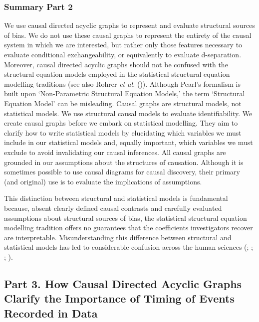 \documentclass[
  single column]{article}
\begin{document}
\newpage{}

\subsubsection{Summary Part 2}\label{summary-part-2}

We use causal directed acyclic graphs to represent and evaluate
structural sources of bias. We do not use these causal graphs to
represent the entirety of the causal system in which we are interested,
but rather only those features necessary to evaluate conditional
exchangeability, or equivalently to evaluate d-separation. Moreover,
causal directed acyclic graphs should not be confused with the
structural equation models employed in the statistical structural
equation modelling traditions (see also Rohrer \emph{et al.}
()). Although Pearl's formalism is
built upon `Non-Parametric Structural Equation Models,' the term
`Structural Equation Model' can be misleading. Causal graphs are
structural models, not statistical models. We use structural causal
models to evaluate identifiability. We create causal graphs before we
embark on statistical modelling. They aim to clarify how to write
statistical models by elucidating which variables we must include in our
statistical models and, equally important, which variables we must
exclude to avoid invalidating our causal inferences. All causal graphs
are grounded in our assumptions about the structures of causation.
Although it is sometimes possible to use causal diagrams for causal
discovery, their primary (and original) use is to evaluate the
implications of assumptions.

This distinction between structural and statistical models is
fundamental because, absent clearly defined causal contrasts and
carefully evaluated assumptions about structural sources of bias, the
statistical structural equation modelling tradition offers no guarantees
that the coefficients investigators recover are interpretable.
Misunderstanding this difference between structural and statistical
models has led to considerable confusion across the human sciences
(;
;
;
).

\subsection{Part 3. How Causal Directed Acyclic Graphs Clarify the
Importance of Timing of Events Recorded in Data}\label{id-sec-3}
\end{document}
